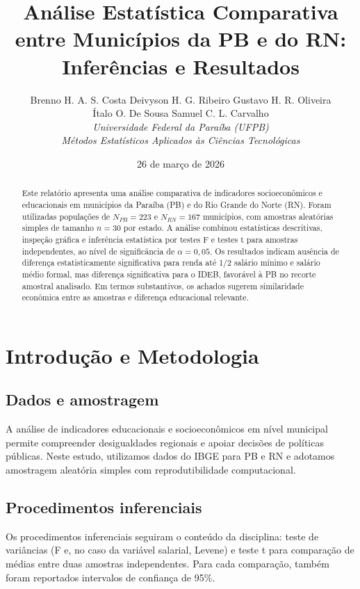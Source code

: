 \documentclass[10pt, a4paper, twocolumn]{article}
\title{\vspace{-1.2cm}\textbf{Análise Estatística Comparativa entre Municípios da PB e do RN: Inferências e Resultados}}
\author{
    Brenno H. A. S. Costa \quad Deivyson H. G. Ribeiro \quad Gustavo H. R. Oliveira \\
    Ítalo O. De Sousa \quad Samuel C. L. Carvalho \\
    \vspace{0.25cm}
    \textit{Universidade Federal da Paraíba (UFPB)} \\
    \textit{Métodos Estatísticos Aplicados às Ciências Tecnológicas}
}
\date{26 de março de 2026}
\begin{document}
\raggedbottom
\maketitle

\begin{abstract}
Este relatório apresenta uma análise comparativa de indicadores socioeconômicos e educacionais em municípios da Paraíba (PB) e do Rio Grande do Norte (RN). Foram utilizadas populações de $N_{PB}=223$ e $N_{RN}=167$ municípios, com amostras aleatórias simples de tamanho $n=30$ por estado. A análise combinou estatísticas descritivas, inspeção gráfica e inferência estatística por testes F e testes t para amostras independentes, ao nível de significância de $\alpha = 0{,}05$. Os resultados indicam ausência de diferença estatisticamente significativa para renda até 1/2 salário mínimo e salário médio formal, mas diferença significativa para o IDEB, favorável à PB no recorte amostral analisado. Em termos substantivos, os achados sugerem similaridade econômica entre as amostras e diferença educacional relevante.
\end{abstract}

\section{Introdução e Metodologia}
\subsection{Dados e amostragem}
A análise de indicadores educacionais e socioeconômicos em nível municipal permite compreender desigualdades regionais e apoiar decisões de políticas públicas. Neste estudo, utilizamos dados do IBGE para PB e RN e adotamos amostragem aleatória simples com reprodutibilidade computacional.

\subsection{Procedimentos inferenciais}
Os procedimentos inferenciais seguiram o conteúdo da disciplina: teste de variâncias (F e, no caso da variável salarial, Levene) e teste t para comparação de médias entre duas amostras independentes. Para cada comparação, também foram reportados intervalos de confiança de 95\%.
\end{document}

